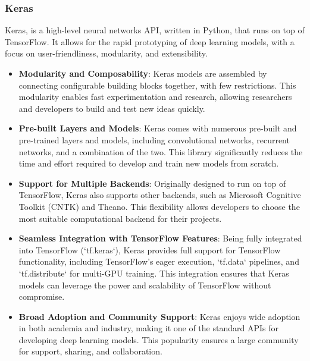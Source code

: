 \subsubsection{Keras}

Keras, is a high-level neural networks API, written in Python, that runs on top of TensorFlow. It allows for the rapid prototyping of deep learning models, with a
focus on user-friendliness, modularity, and extensibility. \cite{keras}

\begin{itemize}
    \item \textbf{Modularity and Composability}: Keras models are assembled by connecting configurable building blocks together, with few restrictions. 
    This modularity enables fast experimentation and research, allowing researchers and developers to build and test new ideas quickly.

    \item \textbf{Pre-built Layers and Models}: Keras comes with numerous pre-built and pre-trained layers and models, including convolutional networks, 
    recurrent networks, and a combination of the two. This library significantly reduces the time and effort required to develop and train new models 
    from scratch.

    \item \textbf{Support for Multiple Backends}: Originally designed to run on top of TensorFlow, Keras also supports other backends, such as Microsoft 
    Cognitive Toolkit (CNTK) and Theano. This flexibility allows developers to choose the most suitable computational backend for their projects.

    \item \textbf{Seamless Integration with TensorFlow Features}: Being fully integrated into TensorFlow (`tf.keras`), Keras provides full support for 
    TensorFlow functionality, including TensorFlow's eager execution, `tf.data` pipelines, and `tf.distribute` for multi-GPU training. This integration ensures 
    that Keras models can leverage the power and scalability of TensorFlow without compromise.

    \item \textbf{Broad Adoption and Community Support}: Keras enjoys wide adoption in both academia and industry, making it one of the standard APIs for 
    developing deep learning models. This popularity ensures a large community for support, sharing, and collaboration.

\end{itemize}

